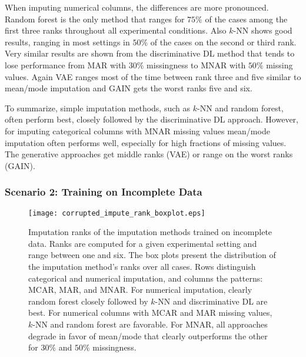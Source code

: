 When imputing numerical columns, the differences are more pronounced. Random forest is the only method that ranges for $75\%$ of the cases among the first three ranks throughout all experimental conditions. Also $k$-NN shows good results, ranging in most settings in $50\%$ of the cases on the second or third rank. Very similar results are shown from the discriminative DL method that tends to lose performance from MAR with $30\%$ missingness to MNAR with $50\%$ missing values. Again VAE ranges most of the time between rank three and five similar to mean/mode imputation and GAIN gets the worst ranks five and six.

To summarize, simple imputation methods, such as $k$-NN and random forest, often perform best, closely followed by the discriminative DL approach. However, for imputing categorical columns with MNAR missing values mean/mode imputation often performs well, especially for high fractions of missing values. The generative approaches get middle ranks (VAE) or range on the worst ranks (GAIN).


\subsubsection{Scenario 2: Training on Incomplete Data}


\begin{figure}\centering
    \texttt{[image: corrupted\_impute\_rank\_boxplot.eps]}
    \caption[Imputation Ranks - Corrupted]{Imputation ranks of the  imputation methods trained on incomplete data. Ranks are computed for a given experimental setting and range between one and six. The box plots present the distribution of the imputation method's ranks over all cases. Rows distinguish categorical and numerical imputation, and columns the patterns: MCAR, MAR, and MNAR. For numerical imputation, clearly random forest closely followed by $k$-NN and discriminative DL are best. For numerical columns with MCAR and MAR missing values, $k$-NN and random forest are favorable. For MNAR, all approaches degrade in favor of mean/mode that clearly outperforms the other for $30\%$ and $50\%$ missingness.}
	\label{fig:corrupted_impute_rank_boxplot}
\end{figure}

